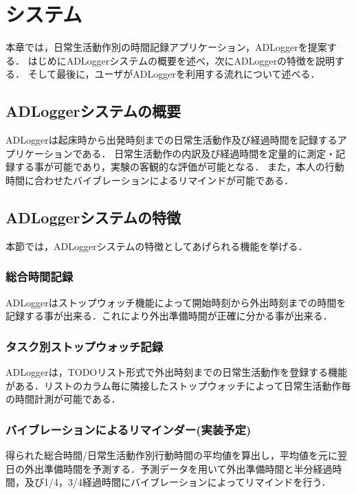 \chapter{システム}
本章では，日常生活動作別の時間記録アプリケーション，ADLoggerを提案する．
はじめにADLoggerシステムの概要を述べ，次にADLoggerの特徴を説明する．
そして最後に，ユーザがADLoggerを利用する流れについて述べる．

\section{ADLoggerシステムの概要}
ADLoggerは起床時から出発時刻までの日常生活動作及び経過時間を記録するアプリケーションである．
日常生活動作の内訳及び経過時間を定量的に測定・記録する事が可能であり，実験の客観的な評価が可能となる．
また，本人の行動時間に合わせたバイブレーションによるリマインドが可能である．

\section{ADLoggerシステムの特徴}
本節では，ADLoggerシステムの特徴としてあげられる機能を挙げる．

\subsection{総合時間記録}
ADLoggerはストップウォッチ機能によって開始時刻から外出時刻までの時間を記録する事が出来る．これにより外出準備時間が正確に分かる事が出来る．
\subsection{タスク別ストップウォッチ記録}
ADLoggerは，TODOリスト形式で外出時刻までの日常生活動作を登録する機能がある．リストのカラム毎に隣接したストップウォッチによって日常生活動作毎の時間計測が可能である．
\subsection{バイブレーションによるリマインダー(実装予定)}
得られた総合時間/日常生活動作別行動時間の平均値を算出し，平均値を元に翌日の外出準備時間を予測する．予測データを用いて外出準備時間と半分経過時間，及び1/4，3/4経過時間にバイブレーションによってリマインドを行う．


